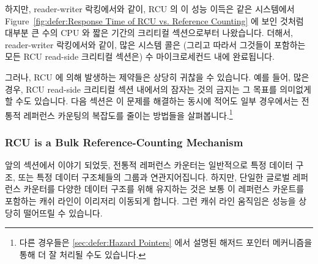 하지만, reader-writer 락킹에서와 같이, RCU 의 이 성능 이득은 같은 시스템에서
Figure~\ref{fig:defer:Response Time of RCU vs. Reference Counting}
에 보인 것처럼 대부분 큰 수의 CPU 와 짧은 기간의 크리티컬 섹션으로부터
나왔습니다.
더해서, reader-writer 락킹에서와 같이, 많은 시스템 콜은 (그리고 따라서 그것들이
포함하는 모든 RCU read-side 크리티컬 섹션은) 수 마이크로세컨드 내에 완료됩니다.

그러나, RCU 에 의해 발생하는 제약들은 상당히 귀찮을 수 있습니다.
예를 들어, 많은 경우, RCU read-side 크리티컬 섹션 내에서의 잠자는 것의 금지는
그 목표를 의미없게 할 수도 있습니다.
다음 섹션은 이 문제를 해결하는 동시에 적어도 일부 경우에서는 전통적 레퍼런스
카운팅의 복잡도를 줄이는 방법들을 살펴봅니다.\footnote{
	다른 경우들은 \cref{sec:defer:Hazard Pointers} 에서 설명된 해저드
	포인터 메커니즘을 통해 더 잘 처리될 수도 있습니다.}

\subsubsection{RCU is a Bulk Reference-Counting Mechanism}
\label{sec:defer:RCU is a Bulk Reference-Counting Mechanism}

앞의 섹션에서 이야기 되었듯, 전통적 레퍼런스 카운터는 일반적으로 특정 데이터
구조, 또는 특정 데이터 구조체들의 그룹과 연관지어집니다.
하지만, 단일한 글로벌 레퍼런스 카운터를 다양한 데이터 구조를 위해 유지하는 것은
보통 이 레퍼런스 카운트를 포함하는 캐쉬 라인이 이리저리 이동되게 합니다.
그런 캐쉬 라인 움직임은 성능을 상당히 떨어뜨릴 수 있습니다.

